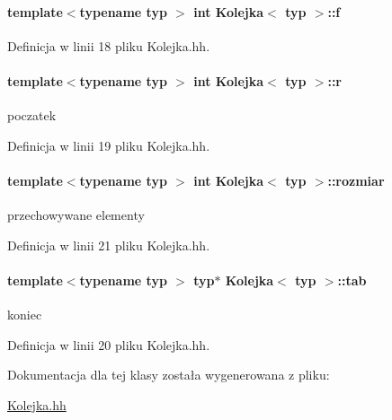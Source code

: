 \paragraph[{f}]{\setlength{\rightskip}{0pt plus 5cm}template$<$typename typ $>$ int {\bf Kolejka}$<$ typ $>$\+::f\hspace{0.3cm}{\ttfamily [private]}}\label{class_kolejka_aa533196e5ca1ca0033142a1588000edd}


Definicja w linii 18 pliku Kolejka.\+hh.

\hypertarget{class_kolejka_aa26f38fd232737021fb82f5d8e86c724}{}
\paragraph[{r}]{\setlength{\rightskip}{0pt plus 5cm}template$<$typename typ $>$ int {\bf Kolejka}$<$ typ $>$\+::r\hspace{0.3cm}{\ttfamily [private]}}\label{class_kolejka_aa26f38fd232737021fb82f5d8e86c724}
poczatek 

Definicja w linii 19 pliku Kolejka.\+hh.

\hypertarget{class_kolejka_a031fd520e5f22daac808dbeeb705832a}{}
\paragraph[{rozmiar}]{\setlength{\rightskip}{0pt plus 5cm}template$<$typename typ $>$ int {\bf Kolejka}$<$ typ $>$\+::rozmiar\hspace{0.3cm}{\ttfamily [private]}}\label{class_kolejka_a031fd520e5f22daac808dbeeb705832a}
przechowywane elementy 

Definicja w linii 21 pliku Kolejka.\+hh.

\hypertarget{class_kolejka_a333beaaaf8ccecbfd4b84a7840d3bd33}{}
\paragraph[{tab}]{\setlength{\rightskip}{0pt plus 5cm}template$<$typename typ $>$ typ$\ast$ {\bf Kolejka}$<$ typ $>$\+::tab\hspace{0.3cm}{\ttfamily [private]}}\label{class_kolejka_a333beaaaf8ccecbfd4b84a7840d3bd33}
koniec 

Definicja w linii 20 pliku Kolejka.\+hh.



Dokumentacja dla tej klasy została wygenerowana z pliku\+:\begin{DoxyCompactItemize}
\item 
\hyperlink{_kolejka_8hh}{Kolejka.\+hh}\end{DoxyCompactItemize}
